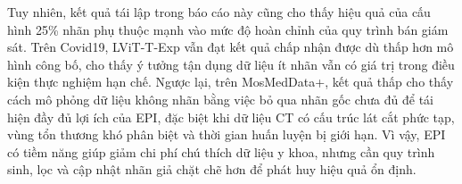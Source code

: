 Tuy nhiên, kết quả tái lập trong báo cáo này cũng cho thấy hiệu quả của cấu hình 25\% nhãn phụ thuộc mạnh vào mức độ hoàn chỉnh của quy trình bán giám sát. Trên Covid19, LViT-T-Exp vẫn đạt kết quả chấp nhận được dù thấp hơn mô hình công bố, cho thấy ý tưởng tận dụng dữ liệu ít nhãn vẫn có giá trị trong điều kiện thực nghiệm hạn chế. Ngược lại, trên MosMedData+, kết quả thấp cho thấy cách mô phỏng dữ liệu không nhãn bằng việc bỏ qua nhãn gốc chưa đủ để tái hiện đầy đủ lợi ích của EPI, đặc biệt khi dữ liệu CT có cấu trúc lát cắt phức tạp, vùng tổn thương khó phân biệt và thời gian huấn luyện bị giới hạn. Vì vậy, EPI có tiềm năng giúp giảm chi phí chú thích dữ liệu y khoa, nhưng cần quy trình sinh, lọc và cập nhật nhãn giả chặt chẽ hơn để phát huy hiệu quả ổn định.